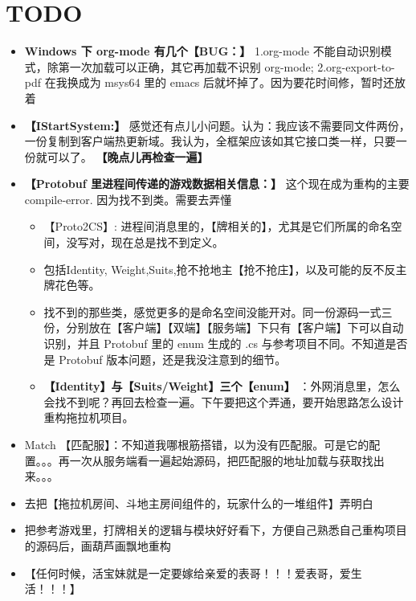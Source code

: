 \documentclass[9pt, b5paper]{article}
\begin{document}
\section{{\bfseries\sffamily TODO} }
\label{sec-10}
\begin{itemize}
\item \textbf{Windows 下 org-mode 有几个【BUG：】} 1.org-mode 不能自动识别模式，除第一次加载可以正确，其它再加载不识别 org-mode; 2.org-export-to-pdf 在我换成为 msys64 里的 emacs 后就坏掉了。因为要花时间修，暂时还放着
\item \textbf{【IStartSystem:】} 感觉还有点儿小问题。认为：我应该不需要同文件两份，一份复制到客户端热更新域。我认为，全框架应该如其它接口类一样，只要一份就可以了。 \textbf{【晚点儿再检查一遍】}
\item \textbf{【Protobuf 里进程间传递的游戏数据相关信息：】} 这个现在成为重构的主要 compile-error. 因为找不到类。需要去弄懂
\begin{itemize}
\item 【Proto2CS】: 进程间消息里的，【牌相关的】，尤其是它们所属的命名空间，没写对，现在总是找不到定义。
\item 包括Identity, Weight,Suits,抢不抢地主【抢不抢庄】，以及可能的反不反主牌花色等。
\item 找不到的那些类，感觉更多的是命名空间没能开对。同一份源码一式三份，分别放在【客户端】【双端】【服务端】下只有【客户端】下可以自动识别，并且 Protobuf 里的 enum 生成的 .cs 与参考项目不同。不知道是否是 Protobuf 版本问题，还是我没注意到的细节。
\item \textbf{【Identity】与【Suits/Weight】三个【enum】} ：外网消息里，怎么会找不到呢？再回去检查一遍。下午要把这个弄通，要开始思路怎么设计重构拖拉机项目。
\end{itemize}
\item Match 【匹配服】：不知道我哪根筋搭错，以为没有匹配服。可是它的配置。。。再一次从服务端看一遍起始源码，把匹配服的地址加载与获取找出来。。。
\item 去把【拖拉机房间、斗地主房间组件的，玩家什么的一堆组件】弄明白
\item 把参考游戏里，打牌相关的逻辑与模块好好看下，方便自己熟悉自己重构项目的源码后，画葫芦画飘地重构
\item 【任何时候，活宝妹就是一定要嫁给亲爱的表哥！！！爱表哥，爱生活！！！】
\end{itemize}
\end{document}
